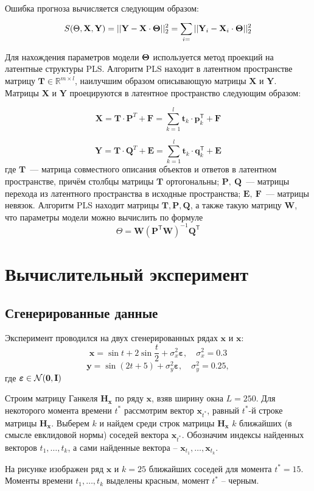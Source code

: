 \documentclass[14pt]{article}
\newcommand{\bE}{\mathbf{E}}
\newcommand{\bF}{\mathbf{F}}
\newcommand{\bH}{\mathbf{H}}
\newcommand{\bI}{\mathbf{I}}
\newcommand{\bP}{\mathbf{P}}
\newcommand{\bQ}{\mathbf{Q}}
\newcommand{\bT}{\mathbf{T}}
\newcommand{\bW}{\mathbf{W}}
\newcommand{\bX}{\mathbf{X}}
\newcommand{\bY}{\mathbf{Y}}
\newcommand{\bp}{\mathbf{p}}
\newcommand{\bq}{\mathbf{q}}
\newcommand{\bt}{\mathbf{t}}
\newcommand{\bx}{\mathbf{x}}
\newcommand{\by}{\mathbf{y}}
\begin{document}
Ошибка прогноза вычисляется следующим образом:
$$S(\Theta, \mathbf{X}, \mathbf{Y}) = ||\mathbf{Y} - \mathbf{X}\cdot\bTheta||^2_2 = \sum_{i = }^{}{||\bY_i - \bX_i\cdot\bTheta||^2_2}$$ 

Для нахождения параметров модели $\mathbf{\Theta}$ используется метод проекций на латентные структуры PLS.  Алгоритм PLS находит в латентном пространстве матрицу $\mathbf{T} \in \mathbb{R}^{m \times l}$, наилучшим образом описывающую матрицы $\mathbf{X}$ и $\mathbf{Y}$. Матрицы $\mathbf{X}$ и $\mathbf{Y}$ проецируются в латентное пространство следующим образом:

$$\bX = \bT \cdot \bP^{{T}} + \bF= \sum_{k = 1}^{l}{\bt_k\cdot \bp_k^{\mathsf{T}} + \bF}$$

$$\bY = \bT \cdot \bQ^{{T}} + \bE= \sum_{k = 1}^{l}{\bt_k\cdot \bq_k^{\mathsf{T}} + \bE}$$
где $\bT$~--- матрица совместного описания объектов и ответов в латентном пространстве, причём столбцы матрицы $\bT$ ортогональны; $\bP,\ \bQ$~--- матрицы перехода из латентного пространства в  исходные пространства; $\bE,\ \bF$~--- матрицы невязок.
Алгоритм PLS находит матрицы $\bT, \bP, \bQ$, а также такую матрицу $\bW$, что параметры модели можно вычислить по формуле 
$$\Theta = \bW (\bP^{\mathsf{T}} \bW)^{-1} \bQ^{\mathsf{T}}$$

\section{Вычислительный эксперимент}
\subsection{Сгенерированные данные}
Эксперимент проводился на двух сгенерированных рядах $\bx$ и $\bx$:
$$\bx = \sin t + 2\sin\frac{t}{2} + \sigma^2_x\bm{\varepsilon}, \quad \sigma^2_x = 0.3$$
$$\by = \sin(2t + 5) + \sigma^2_y\bm{\varepsilon}, \quad \sigma^2_y = 0.25,$$
где $\bm{\varepsilon} \in \mathcal{N}(\bold{0}, \bI)$

Строим матрицу Ганкеля $\bH_{\bx}$ по ряду $\bx$, взяв ширину окна $L = 250$. Для некоторого момента времени $t^*$ рассмотрим вектор $\bx_{t^*}$, равный $t^*$-й строке матрицы $\bH_{\bx}$. Выберем $k$ и найдем среди строк матрицы $\bH_{\bx}$ $k$ ближайших (в смысле евклидовой нормы) соседей вектора $\bx_{t^*}$. Обозначим индексы найденных векторов $t_1, \ldots, t_k$, а сами найденные вектора -- $\bx_{t_1}, \ldots, \bx_{t_k}$. 

На рисунке изображен ряд $\bx$ и $k = 25$ ближайших соседей для момента $t^* = 15$. Моменты времени $t_1, \ldots, t_{k}$ выделены красным, момент $t^*$ -- черным. 
\end{document}
